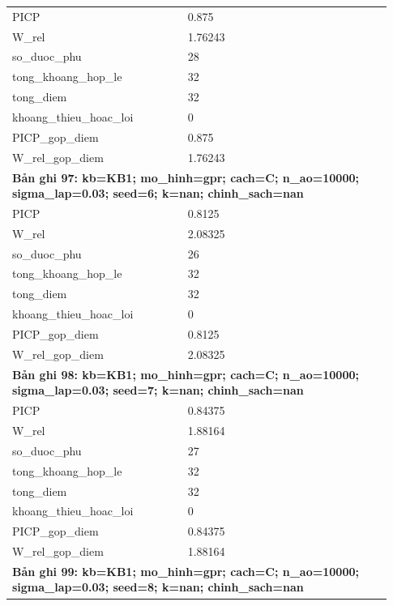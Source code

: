 \begin{longtable}{p{0.43\linewidth}p{0.50\linewidth}}
PICP & 0.875 \\
W\_\allowbreak rel & 1.76243 \\
so\_\allowbreak duoc\_\allowbreak phu & 28 \\
tong\_\allowbreak khoang\_\allowbreak hop\_\allowbreak le & 32 \\
tong\_\allowbreak diem & 32 \\
khoang\_\allowbreak thieu\_\allowbreak hoac\_\allowbreak loi & 0 \\
PICP\_\allowbreak gop\_\allowbreak diem & 0.875 \\
W\_\allowbreak rel\_\allowbreak gop\_\allowbreak diem & 1.76243 \\
\midrule
\multicolumn{2}{p{0.95\linewidth}}{\textbf{Bản ghi 97: kb=KB1; mo\_hinh=gpr; cach=C; n\_ao=10000; sigma\_lap=0.03; seed=6; k=nan; chinh\_sach=nan}} \\
PICP & 0.8125 \\
W\_\allowbreak rel & 2.08325 \\
so\_\allowbreak duoc\_\allowbreak phu & 26 \\
tong\_\allowbreak khoang\_\allowbreak hop\_\allowbreak le & 32 \\
tong\_\allowbreak diem & 32 \\
khoang\_\allowbreak thieu\_\allowbreak hoac\_\allowbreak loi & 0 \\
PICP\_\allowbreak gop\_\allowbreak diem & 0.8125 \\
W\_\allowbreak rel\_\allowbreak gop\_\allowbreak diem & 2.08325 \\
\midrule
\multicolumn{2}{p{0.95\linewidth}}{\textbf{Bản ghi 98: kb=KB1; mo\_hinh=gpr; cach=C; n\_ao=10000; sigma\_lap=0.03; seed=7; k=nan; chinh\_sach=nan}} \\
PICP & 0.84375 \\
W\_\allowbreak rel & 1.88164 \\
so\_\allowbreak duoc\_\allowbreak phu & 27 \\
tong\_\allowbreak khoang\_\allowbreak hop\_\allowbreak le & 32 \\
tong\_\allowbreak diem & 32 \\
khoang\_\allowbreak thieu\_\allowbreak hoac\_\allowbreak loi & 0 \\
PICP\_\allowbreak gop\_\allowbreak diem & 0.84375 \\
W\_\allowbreak rel\_\allowbreak gop\_\allowbreak diem & 1.88164 \\
\midrule
\multicolumn{2}{p{0.95\linewidth}}{\textbf{Bản ghi 99: kb=KB1; mo\_hinh=gpr; cach=C; n\_ao=10000; sigma\_lap=0.03; seed=8; k=nan; chinh\_sach=nan}} \\

\end{longtable}
